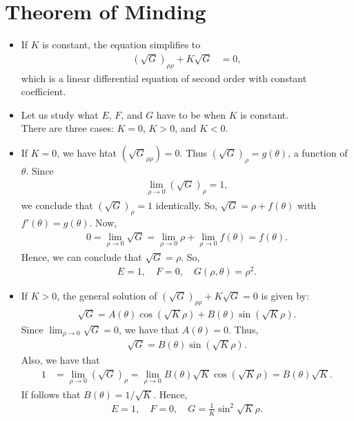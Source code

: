 \documentclass[10pt]{article}
\newcommand{\ra}{\rightarrow}
\begin{document}
  \section{Theorem of Minding}
  \begin{itemize}
    \item If $K$ is constant, the equation simplifies to
    \begin{align*}
      (\sqrt{G})_{\rho\rho} + K \sqrt{G} &= 0,
    \end{align*}
    which is a linear differential equation of second order with constant coefficient.

    \item Let us study what $E$, $F$, and $G$ have to be when $K$ is constant.\\
    There are three cases: $K = 0$, $K > 0$, and $K < 0$.

    \item If $K = 0$, we have htat $(\sqrt{G}_{\rho\rho}) = 0$. Thus $(\sqrt{G})_\rho = g(\theta)$, a function of $\theta$. Since
    \begin{align*}
      \lim_{\rho \ra 0} (\sqrt{G})_\rho = 1,
    \end{align*}
    we conclude that $(\sqrt{G})_\rho = 1$ identically. So, $\sqrt{G} = \rho + f(\theta)$ with $f'(\theta) = g(\theta).$ Now,
    \begin{align*}
      0 = \lim_{\rho \ra 0} \sqrt{G} = \lim_{\rho \ra 0} \rho + \lim_{\rho \ra 0} f(\theta) = f(\theta).
    \end{align*}
    Hence, we can conclude that $\sqrt{G} = \rho$. So,
    \begin{align*}
      E = 1,\quad F = 0,\quad G(\rho,\theta) = \rho^2.
    \end{align*}

    \item If $K > 0$, the general solution of $(\sqrt{G})_{\rho\rho} + K \sqrt{G} = 0$ is given by:
    \begin{align*}
      \sqrt{G} = A(\theta) \cos(\sqrt{K}\rho) + B(\theta) \sin(\sqrt{K}\rho).
    \end{align*}
    Since $\lim_{\rho \ra 0} \sqrt{G} = 0$, we have that $A(\theta) = 0$. Thus,
    \begin{align*}
      \sqrt{G} = B(\theta)\sin(\sqrt{K} \rho).
    \end{align*}
    Also, we have that
    \begin{align*}
      1 
      &= \lim_{\rho \ra 0} (\sqrt{G})_\rho 
      =  \lim_{\rho \ra 0} B(\theta) \sqrt{K} \cos(\sqrt{K} \rho)
      = B(\theta)\sqrt{K}.
    \end{align*}
    If follows that $B(\theta) = 1 / \sqrt{K}$. Hence,
    \begin{align*}
      E = 1, \quad F = 0, \quad G = \frac{1}{K}\sin^2 {\sqrt{K} \rho}.
    \end{align*}


\end{itemize}
\end{document}
